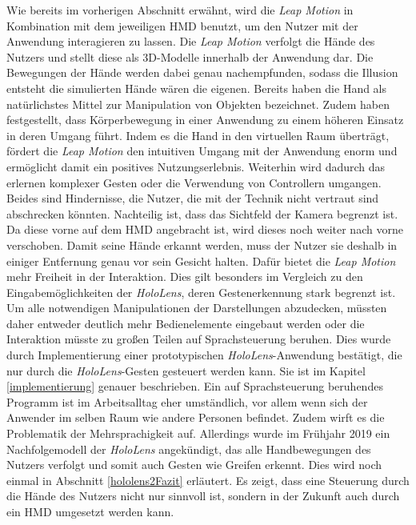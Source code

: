 Wie bereits im vorherigen Abschnitt erwähnt, wird die \textit{Leap Motion} in Kombination mit dem jeweiligen HMD benutzt, um den Nutzer mit der Anwendung interagieren zu lassen. 
Die \textit{Leap Motion} verfolgt die Hände des Nutzers und stellt diese als 3D-Modelle innerhalb der Anwendung dar. Die Bewegungen der Hände werden dabei genau nachempfunden, sodass die Illusion entsteht die simulierten Hände wären die eigenen. 
Bereits \cite{Zimmerman86} haben die Hand als natürlichstes Mittel zur Manipulation von Objekten bezeichnet. Zudem haben \cite{Bianchi-Berthouze07} festgestellt, dass Körperbewegung in einer Anwendung zu einem höheren Einsatz in deren Umgang führt. Indem es die Hand in den virtuellen Raum überträgt, fördert die \textit{Leap Motion} den intuitiven Umgang mit der Anwendung enorm und ermöglicht damit ein positives Nutzungserlebnis. Weiterhin wird dadurch das erlernen komplexer Gesten oder die Verwendung von Controllern umgangen. Beides sind Hindernisse, die Nutzer, die mit der Technik nicht vertraut sind abschrecken könnten. 
Nachteilig ist, dass das Sichtfeld der Kamera begrenzt ist. Da diese vorne auf dem HMD angebracht ist, wird dieses noch weiter nach vorne verschoben. Damit seine Hände erkannt werden, muss der Nutzer sie deshalb in einiger Entfernung genau vor sein Gesicht halten. 
Dafür bietet die \textit{Leap Motion} mehr Freiheit in der Interaktion. Dies gilt besonders im Vergleich zu den Eingabemöglichkeiten der \textit{HoloLens}, 
deren Gestenerkennung stark begrenzt ist. Um alle notwendigen Manipulationen der Darstellungen abzudecken, müssten daher entweder deutlich mehr Bedienelemente eingebaut werden oder die Interaktion müsste zu großen Teilen auf Sprachsteuerung beruhen. 
Dies wurde durch Implementierung einer prototypischen \textit{HoloLens}-Anwendung bestätigt, die nur durch die \textit{HoloLens}-Gesten gesteuert werden kann. Sie ist im Kapitel \ref{implementierung} genauer beschrieben.
Ein auf Sprachsteuerung beruhendes Programm ist im Arbeitsalltag eher umständlich, vor allem wenn sich der Anwender im selben Raum wie andere Personen befindet. Zudem wirft es die Problematik der Mehrsprachigkeit auf. 
Allerdings wurde im Frühjahr 2019 ein Nachfolgemodell der \textit{HoloLens} angekündigt, das alle Handbewegungen des Nutzers verfolgt und somit auch Gesten wie Greifen erkennt. Dies wird noch einmal in Abschnitt \ref{hololens2Fazit} erläutert. Es zeigt, dass eine Steuerung durch die Hände des Nutzers nicht nur sinnvoll ist, sondern in der Zukunft auch durch ein HMD umgesetzt werden kann.


